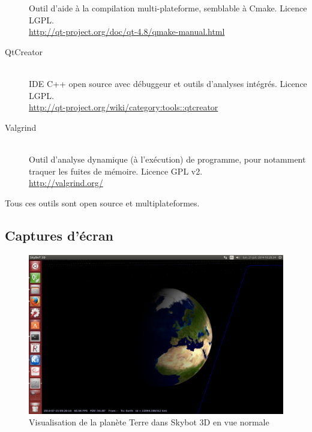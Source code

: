 \documentclass[a4paper,french,12pt]{article}
\begin{document}
\begin{description}
		    Outil d'aide à la compilation multi-plateforme, semblable à Cmake.
		    Licence LGPL.\\
		    \url{http://qt-project.org/doc/qt-4.8/qmake-manual.html}
		    \item [QtCreator]~\\
		      IDE C++ open source avec débuggeur et outils d'analyses intégrés.
		      Licence LGPL.\\
		      \url{http://qt-project.org/wiki/category:tools::qtcreator}
		  \item [Valgrind]~\\
		      Outil d'analyse dynamique (à l'exécution) de programme, pour notamment traquer les fuites de mémoire.
		      Licence GPL v2.\\
		      \url{http://valgrind.org/}
		  \end{description}

		Tous ces outils sont open source et multiplateformes.
	
	\subsection{Captures d'écran}
		\FloatBarrier
		\newpage
		\begin{figure}
			      \centering
			      \includegraphics[width=1.0\textwidth]{skybot_normal_earth.png}
			      \caption{Visualisation de la planète Terre dans Skybot 3D en vue normale}
		\end{figure}
		
\end{document}
